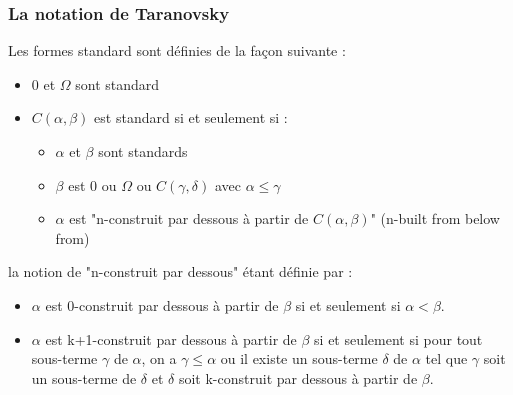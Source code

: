 \documentclass[12pt]{beamer}
\begin{document}
\begin{frame}
\frametitle{La notation de Taranovsky}

\small

Les formes standard sont définies de la façon suivante :

\begin{itemize}
\item 0 et $\Omega$ sont standard
\item \( C(\alpha,\beta) \) est standard si et seulement si :
 \begin{itemize}
 \item $\alpha$ et $\beta$ sont standards
 \item $\beta$ est 0 ou $\Omega$ ou \( C(\gamma,\delta) \) avec \( \alpha \le \gamma \)
 \item $\alpha$ est "n-construit par dessous à partir de \( C(\alpha,\beta) \)" (n-built from below from)
 \end{itemize}
\end{itemize}

la notion de "n-construit par dessous" étant définie par :

\begin{itemize}
\item $\alpha$ est 0-construit par dessous à partir de $\beta$ si et seulement si \( \alpha < \beta \).
\item $\alpha$ est k+1-construit par dessous à partir de $\beta$ si et seulement si pour tout sous-terme $\gamma$ de $\alpha$, on a \( \gamma \le \alpha \) ou il existe un sous-terme $\delta$ de $\alpha$ tel que $\gamma$ soit un sous-terme de $\delta$ et $\delta$ soit k-construit par dessous à partir de $\beta$.
\end{itemize}

\end{frame}
\end{document}
